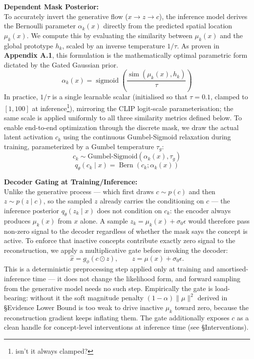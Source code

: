 \documentclass[11pt, a4paper]{article}
\begin{document}
\textbf{Dependent Mask Posterior:} \\
To accurately invert the generative flow ($x \to z \to c$), the inference model derives the Bernoulli parameter $\alpha_k(x)$ directly from the predicted spatial location $\mu_k(x)$. We compute this by evaluating the similarity between $\mu_k(x)$ and the global prototype $h_k$, scaled by an inverse temperature $1/\tau$. As proven in \textbf{Appendix A.1}, this formulation is the mathematically optimal parametric form dictated by the Gated Gaussian prior.
\[
\alpha_k(x) = \operatorname{sigmoid}\!\left(\frac{\operatorname{sim}(\mu_k(x), h_k)}{\tau}\right)
\]
In practice, $1/\tau$ is a single learnable scalar (initialised so that $\tau = 0.1$, clamped to $[1, 100]$ at inference{\color{red}\footnote{\color{red}isn't it always clamped?}}), mirroring the CLIP logit-scale parameterisation; the same scale is applied uniformly to all three similarity metrics defined below.
To enable end-to-end optimization through the discrete mask, we draw the actual latent activation $c_k$ using the continuous Gumbel-Sigmoid relaxation during training, parameterized by a Gumbel temperature $\tau_g$:
\[
c_k \sim \text{Gumbel-Sigmoid}(\alpha_k(x), \tau_g)
\]
\[
q_\theta(c_k \mid x) = \operatorname{Bern}(c_k; \alpha_k(x))
\]

\textbf{Decoder Gating at Training/Inference:} \\
Unlike the generative process --- which first draws $c \sim p(c)$ and then $z \sim p(z \mid c)$, so the sampled $z$ already carries the conditioning on $c$ --- the inference posterior $q_\theta(z_k \mid x)$ does not condition on $c_k$: the encoder always produces $\mu_k(x)$ from $x$ alone. A sample $z_k = \mu_k(x) + \sigma_0 \epsilon$ would therefore pass non-zero signal to the decoder regardless of whether the mask says the concept is active. To enforce that inactive concepts contribute exactly zero signal to the reconstruction, we apply a multiplicative gate before invoking the decoder:
\[
\hat{x} = g_\phi(c \odot z), \qquad z = \mu(x) + \sigma_0 \epsilon.
\]
This is a deterministic preprocessing step applied only at training and amortised-inference time --- it does not change the likelihood form, and forward sampling from the generative model needs no such step. Empirically the gate is load-bearing: without it the soft magnitude penalty $(1 - \alpha)\|\mu\|^2$ derived in \S Evidence Lower Bound is too weak to drive inactive $\mu_k$ toward zero, because the reconstruction gradient keeps inflating them. The gate additionally exposes $c$ as a clean handle for concept-level interventions at inference time (see \S Interventions).
\end{document}
